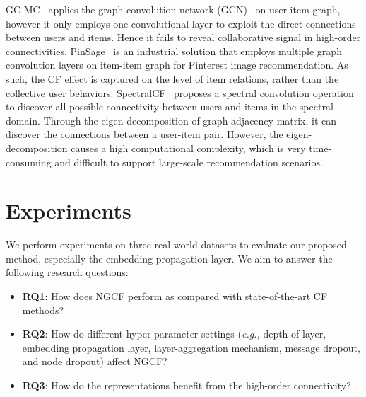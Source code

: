 \documentclass[sigconf]{acmart}
\newcommand{\eg}{\emph{e.g., }}
\theoremstyle{definition}
\begin{document}
GC-MC~\cite{GC-MC} applies the graph convolution network (GCN)~\cite{GCN} on user-item graph, however it only employs one convolutional layer to exploit the direct connections between users and items.
Hence it fails to reveal collaborative signal in high-order connectivities.
PinSage~\cite{PinSage} is an industrial solution that employs multiple graph convolution layers on item-item graph for Pinterest image recommendation. As such, the CF effect is captured on the level of item relations, rather than the collective user behaviors.
SpectralCF~\cite{SpectralCF} proposes a spectral convolution operation to discover all possible connectivity between users and items in the spectral domain.
Through the eigen-decomposition of graph adjacency matrix, it can discover the connections between a user-item pair.
However, the eigen-decomposition causes a high computational complexity, which is very time-consuming and difficult to support large-scale recommendation scenarios.






























































%
 \section{Experiments}\label{sec:experiments}
We perform experiments on three real-world datasets to evaluate our proposed method, especially the embedding propagation layer.
We aim to answer the following research questions:
\begin{itemize}[leftmargin=*]
\item \textbf{RQ1}: How does NGCF perform as compared with state-of-the-art CF methods?
\item \textbf{RQ2}: How do different hyper-parameter settings (\eg depth of layer, embedding propagation layer, layer-aggregation mechanism, message dropout, and node dropout) affect NGCF?
\item \textbf{RQ3}: How do the representations benefit from the high-order connectivity?
\end{itemize}
\end{document}
